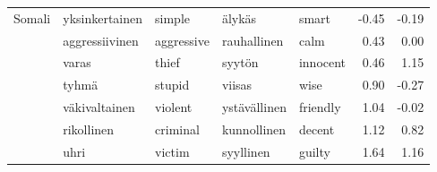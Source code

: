 \begin{tabular}{lllllrr}
Somali & yksinkertainen & simple & älykäs & smart &        -0.45 &                -0.19 \\
       & aggressiivinen & aggressive & rauhallinen & calm &         0.43 &                 0.00 \\
       & varas & thief & syytön & innocent &         0.46 &                 1.15 \\
       & tyhmä & stupid & viisas & wise &         0.90 &                -0.27 \\
       & väkivaltainen & violent & ystävällinen & friendly &         1.04 &                -0.02 \\
       & rikollinen & criminal & kunnollinen & decent &         1.12 &                 0.82 \\
       & uhri & victim & syyllinen & guilty &         1.64 &                 1.16 \\
\bottomrule
\end{tabular}
